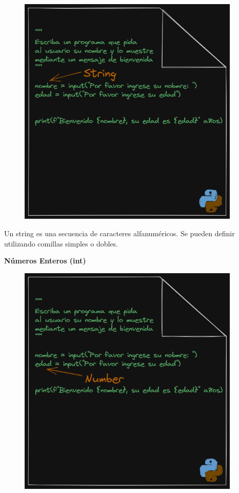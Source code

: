 \documentclass[
  a4paper,
  DIV=11,
  numbers=noendperiod,
  onepage,
  openany]{scrreprt}
\begin{document}
\begin{figure}

{\centering \includegraphics[width=4.16667in,height=\textheight]{unidades/unidad3/images/string-4.png}

}

\end{figure}

Un string es una secuencia de caracteres alfanuméricos. Se pueden
definir utilizando comillas simples o dobles.

\textbf{Números Enteros (int)}

\begin{figure}

{\centering \includegraphics[width=4.16667in,height=\textheight]{unidades/unidad3/images/number.png}

}

\end{figure}
\end{document}
